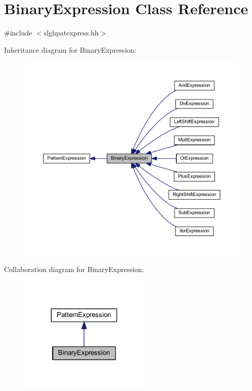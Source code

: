 \hypertarget{class_binary_expression}{}\section{Binary\+Expression Class Reference}
\label{class_binary_expression}


{\ttfamily \#include $<$slghpatexpress.\+hh$>$}



Inheritance diagram for Binary\+Expression\+:
\nopagebreak
\begin{figure}[H]
\begin{center}
\leavevmode
\includegraphics[width=350pt]{class_binary_expression__inherit__graph}
\end{center}
\end{figure}


Collaboration diagram for Binary\+Expression\+:
\nopagebreak
\begin{figure}[H]
\begin{center}
\leavevmode
\includegraphics[width=177pt]{class_binary_expression__coll__graph}
\end{center}
\end{figure}
